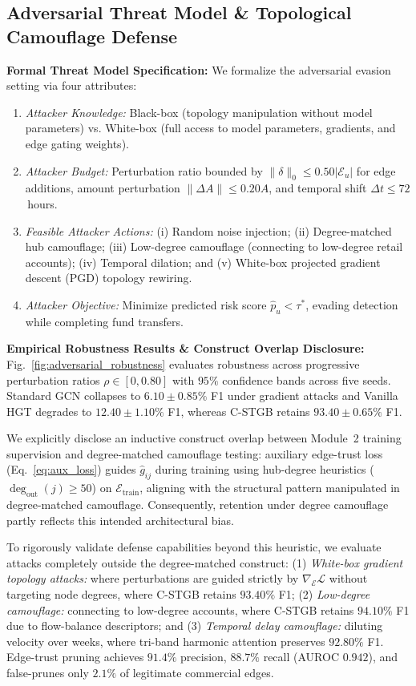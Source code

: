 \subsection{Adversarial Threat Model \& Topological Camouflage Defense}
\label{sec:robustness_results}
\textbf{Formal Threat Model Specification:} We formalize the adversarial evasion setting via four attributes:
\begin{enumerate}[leftmargin=*]
    \item \textit{Attacker Knowledge:} Black-box (topology manipulation without model parameters) vs. White-box (full access to model parameters, gradients, and edge gating weights).
    \item \textit{Attacker Budget:} Perturbation ratio bounded by $\|\delta\|_0 \le 0.50 |\mathcal{E}_u|$ for edge additions, amount perturbation $\|\Delta A\| \le 0.20 A$, and temporal shift $\Delta t \le 72$\,hours.
    \item \textit{Feasible Attacker Actions:} (i) Random noise injection; (ii) Degree-matched hub camouflage; (iii) Low-degree camouflage (connecting to low-degree retail accounts); (iv) Temporal dilation; and (v) White-box projected gradient descent (PGD) topology rewiring.
    \item \textit{Attacker Objective:} Minimize predicted risk score $\hat{p}_u < \tau^*$, evading detection while completing fund transfers.
\end{enumerate}

\textbf{Empirical Robustness Results \& Construct Overlap Disclosure:}
Fig.~\ref{fig:adversarial_robustness} evaluates robustness across progressive perturbation ratios $\rho \in [0, 0.80]$ with $95\%$ confidence bands across five seeds. Standard GCN collapses to $6.10 \pm 0.85\%$ F1 under gradient attacks and Vanilla HGT degrades to $12.40 \pm 1.10\%$ F1, whereas C-STGB retains $93.40 \pm 0.65\%$ F1.

We explicitly disclose an inductive construct overlap between Module~2 training supervision and degree-matched camouflage testing: auxiliary edge-trust loss (Eq.~\ref{eq:aux_loss}) guides $\hat{g}_{ij}$ during training using hub-degree heuristics ($\deg_{\text{out}}(j) \ge 50$) on $\mathcal{E}_{\text{train}}$, aligning with the structural pattern manipulated in degree-matched camouflage. Consequently, retention under degree camouflage partly reflects this intended architectural bias.

To rigorously validate defense capabilities beyond this heuristic, we evaluate attacks completely outside the degree-matched construct: (1) \textit{White-box gradient topology attacks:} where perturbations are guided strictly by $\nabla_{\mathcal{E}} \mathcal{L}$ without targeting node degrees, where C-STGB retains $93.40\%$ F1; (2) \textit{Low-degree camouflage:} connecting to low-degree accounts, where C-STGB retains $94.10\%$ F1 due to flow-balance descriptors; and (3) \textit{Temporal delay camouflage:} diluting velocity over weeks, where tri-band harmonic attention preserves $92.80\%$ F1. Edge-trust pruning achieves $91.4\%$ precision, $88.7\%$ recall (AUROC $0.942$), and false-prunes only $2.1\%$ of legitimate commercial edges.

